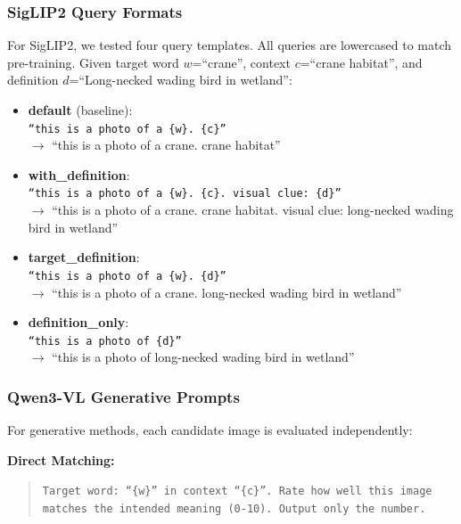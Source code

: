 \documentclass[11pt]{article}
\begin{document}
\subsubsection{SigLIP2 Query Formats}

For SigLIP2, we tested four query templates. All queries are lowercased to match pre-training. Given target word $w$=``crane'', context $c$=``crane habitat'', and definition $d$=``Long-necked wading bird in wetland'':

\begin{itemize}
    \item \textbf{default} (baseline): \\ \texttt{``this is a photo of a \{w\}. \{c\}''} \\ $\rightarrow$ ``this is a photo of a crane. crane habitat''

    \item \textbf{with\_definition}: \\ \texttt{``this is a photo of a \{w\}. \{c\}. visual clue: \{d\}''} \\ $\rightarrow$ ``this is a photo of a crane. crane habitat. visual clue: long-necked wading bird in wetland''

    \item \textbf{target\_definition}: \\ \texttt{``this is a photo of a \{w\}. \{d\}''} \\ $\rightarrow$ ``this is a photo of a crane. long-necked wading bird in wetland''

    \item \textbf{definition\_only}: \\ \texttt{``this is a photo of \{d\}''} \\ $\rightarrow$ ``this is a photo of long-necked wading bird in wetland''
\end{itemize}

\subsubsection{Qwen3-VL Generative Prompts}

For generative methods, each candidate image is evaluated independently:

\textbf{Direct Matching:}
\begin{quote}
\small
\texttt{Target word: ``\{w\}'' in context ``\{c\}''. Rate how well this image matches the intended meaning (0-10). Output only the number.}
\end{quote}
\end{document}
